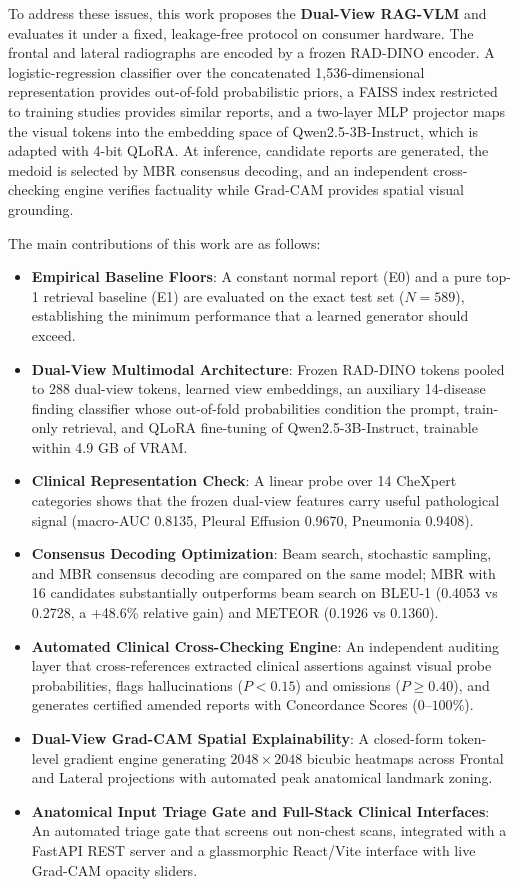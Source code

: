 \documentclass[12pt,a4paper]{report}
\begin{document}
To address these issues, this work proposes the \textbf{Dual-View RAG-VLM} and evaluates it under a fixed, leakage-free protocol on consumer hardware. The frontal and lateral radiographs are encoded by a frozen RAD-DINO encoder. A logistic-regression classifier over the concatenated 1,536-dimensional representation provides out-of-fold probabilistic priors, a FAISS index restricted to training studies provides similar reports, and a two-layer MLP projector maps the visual tokens into the embedding space of Qwen2.5-3B-Instruct, which is adapted with 4-bit QLoRA. At inference, candidate reports are generated, the medoid is selected by MBR consensus decoding, and an independent cross-checking engine verifies factuality while Grad-CAM provides spatial visual grounding.

The main contributions of this work are as follows:
\begin{itemize}
    \item \textbf{Empirical Baseline Floors}: A constant normal report (E0) and a pure top-1 retrieval baseline (E1) are evaluated on the exact test set ($N = 589$), establishing the minimum performance that a learned generator should exceed.
    \item \textbf{Dual-View Multimodal Architecture}: Frozen RAD-DINO tokens pooled to 288 dual-view tokens, learned view embeddings, an auxiliary 14-disease finding classifier whose out-of-fold probabilities condition the prompt, train-only retrieval, and QLoRA fine-tuning of Qwen2.5-3B-Instruct, trainable within 4.9 GB of VRAM.
    \item \textbf{Clinical Representation Check}: A linear probe over 14 CheXpert categories shows that the frozen dual-view features carry useful pathological signal (macro-AUC 0.8135, Pleural Effusion 0.9670, Pneumonia 0.9408).
    \item \textbf{Consensus Decoding Optimization}: Beam search, stochastic sampling, and MBR consensus decoding are compared on the same model; MBR with 16 candidates substantially outperforms beam search on BLEU-1 (0.4053 vs 0.2728, a +48.6\% relative gain) and METEOR (0.1926 vs 0.1360).
    \item \textbf{Automated Clinical Cross-Checking Engine}: An independent auditing layer that cross-references extracted clinical assertions against visual probe probabilities, flags hallucinations ($P < 0.15$) and omissions ($P \ge 0.40$), and generates certified amended reports with Concordance Scores ($0$--$100\%$).
    \item \textbf{Dual-View Grad-CAM Spatial Explainability}: A closed-form token-level gradient engine generating $2048 \times 2048$ bicubic heatmaps across Frontal and Lateral projections with automated peak anatomical landmark zoning.
    \item \textbf{Anatomical Input Triage Gate and Full-Stack Clinical Interfaces}: An automated triage gate that screens out non-chest scans, integrated with a FastAPI REST server and a glassmorphic React/Vite interface with live Grad-CAM opacity sliders.
\end{itemize}
\end{document}
